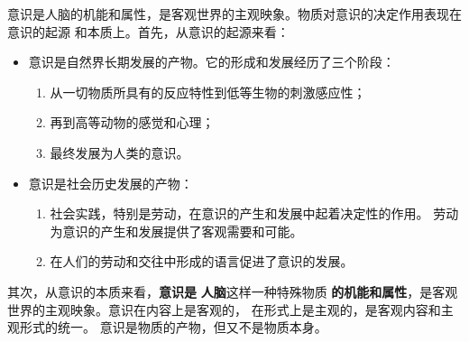 \documentclass[10pt, UTF8]{book} %
\begin{document}
意识是人脑的机能和属性，是客观世界的主观映象。物质对意识的决定作用表现在意识的起源
和本质上。首先，从意识的起源来看：
\begin{itemize}[itemsep=0pt]
    \item 意识是自然界长期发展的产物。它的形成和发展经历了三个阶段：
    \begin{enumerate}[label={$\left.\arabic*\right)$}, itemsep=0pt]
        \item 从一切物质所具有的反应特性到低等生物的刺激感应性；
        \item 再到高等动物的感觉和心理；
        \item 最终发展为人类的意识。
    \end{enumerate}
    \item 意识是社会历史发展的产物：
    \begin{enumerate}[label={$\left.\arabic*\right)$}, itemsep=0pt]
        \item 社会实践，特别是劳动，在意识的产生和发展中起着决定性的作用。
        劳动为意识的产生和发展提供了客观需要和可能。
        \item 在人们的劳动和交往中形成的语言促进了意识的发展。
    \end{enumerate}
\end{itemize}
其次，从意识的本质来看，\textbf{意识是} \textbf{人脑}这样一种特殊物质
\textbf{的机能和属性}，是客观世界的主观映象。意识在内容上是客观的，
在形式上是主观的，是客观内容和主观形式的统一。
意识是物质的产物，但又不是物质本身。
\end{document}
